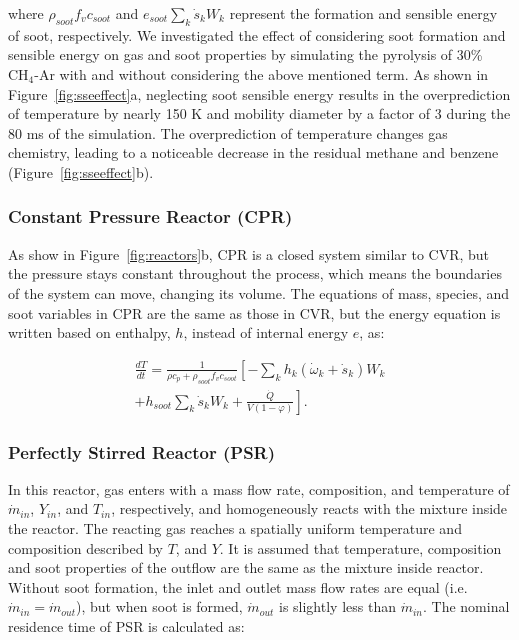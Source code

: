\noindent where $\rho_{soot}f_v c_{soot}$ and $e_{soot}\sum_k \dot{s}_k W_k$ represent the formation and sensible energy of soot, respectively. We investigated the effect of considering soot formation and sensible energy on gas and soot properties by simulating the pyrolysis of 30\%~$\mathrm{CH_4}$-Ar with and without considering the above mentioned term. As shown in Figure~\ref{fig:sseeffect}a, neglecting soot sensible energy results in the overprediction of temperature by nearly 150 K and mobility diameter by a factor of 3 during the 80 ms of the simulation. The overprediction of temperature changes gas chemistry, leading to a noticeable decrease in the residual methane and benzene (Figure~\ref{fig:sseeffect}b).




\subsubsection{Constant Pressure Reactor (CPR)}

As show in Figure~\ref{fig:reactors}b, CPR is a closed system similar to CVR, but the pressure stays constant throughout the process, which means the boundaries of the system can move, changing its volume. The equations of mass, species, and soot variables in CPR are the same as those in CVR, but the energy equation is written based on enthalpy, $h$, instead of internal energy $e$, as:

\begin{equation}
	\begin{split}
		\frac{d T}{d t}=
		\frac{1}{\rho c_p+\rho_{soot}f_v c_{soot}}
		\left[
		-\sum_k h_k
		\left(
		\dot{\omega}_k+\dot{s}_k
		\right) W_k \right. \\
		\left.
		+h_{soot}\sum_k \dot{s}_k W_k
		+\frac{\dot{Q}}{V(1-\varphi)}
		\right]
		\label{eqn:energypressure}.
	\end{split}
\end{equation}

\subsubsection{Perfectly Stirred Reactor (PSR)}
In this reactor, gas enters with a mass flow rate, composition, and temperature of $\dot{m}_{in}$, $Y_{in}$, and $T_{in}$, respectively, and homogeneously reacts with the mixture inside the reactor. The reacting gas reaches a spatially uniform temperature and composition described by $T$, and $Y$. It is assumed that temperature, composition and soot properties of the outflow are the same as the mixture inside reactor. Without soot formation, the inlet and outlet mass flow rates are equal (i.e. ${\dot{m}_{in}}={\dot{m}_{out}}$), but when soot is formed, ${\dot{m}_{out}}$ is slightly less than ${\dot{m}_{in}}$. The nominal residence time of PSR is calculated as:


